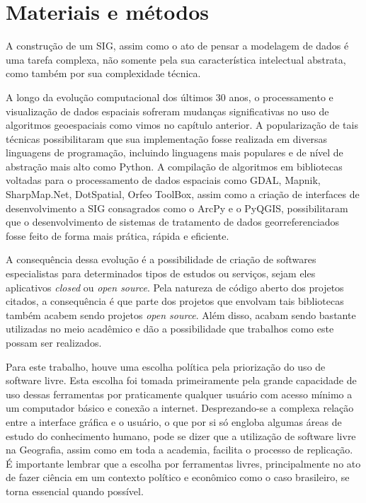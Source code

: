 \chapter{Materiais e métodos}

A construção de um SIG, assim como o ato de pensar a modelagem de dados é uma tarefa complexa, não somente pela sua característica intelectual abstrata, como também por sua complexidade técnica. 

A longo da evolução computacional dos últimos 30 anos, o processamento e visualização de dados espaciais sofreram mudanças significativas no uso de algoritmos geoespaciais como vimos no capítulo anterior. A popularização de tais técnicas possibilitaram que sua implementação fosse realizada em diversas linguagens de programação, incluindo linguagens mais populares e de nível de abstração mais alto como Python. A compilação de algoritmos em bibliotecas voltadas para o processamento de dados espaciais como GDAL, Mapnik, SharpMap.Net, DotSpatial, Orfeo ToolBox, assim como a criação de interfaces de desenvolvimento a SIG consagrados como o ArcPy e o PyQGIS, possibilitaram que o desenvolvimento de sistemas de tratamento de dados georreferenciados fosse feito de forma mais prática, rápida e eficiente. 

A consequência dessa evolução é a possibilidade de criação de softwares especialistas para determinados tipos de estudos ou serviços, sejam eles aplicativos \textit{closed} ou \textit{open source}. Pela natureza de código aberto dos projetos citados, a consequência é que parte dos projetos que envolvam tais bibliotecas também acabem sendo projetos \textit{open source}. Além disso, acabam sendo bastante utilizadas no meio acadêmico e dão a possibilidade que trabalhos como este possam ser realizados.

Para este trabalho, houve uma escolha política pela priorização do uso de software livre. Esta escolha foi tomada primeiramente pela grande capacidade de uso dessas ferramentas por praticamente qualquer usuário com acesso mínimo a um computador básico e conexão a internet. Desprezando-se a complexa relação entre a interface gráfica e o usuário, o que por si só engloba algumas áreas de estudo do conhecimento humano, pode se dizer que a utilização de software livre na Geografia, assim como em toda a academia, facilita o processo de replicação. É importante lembrar que a escolha por ferramentas livres, principalmente no ato de fazer ciência em um contexto político e econômico como o caso brasileiro, se torna essencial quando possível. 

